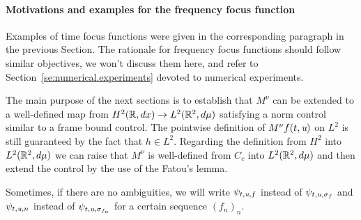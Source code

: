 \paragraph{Motivations and examples for the frequency focus function}
Examples of time focus functions were given in the corresponding paragraph in the previous Section. The rationale for frequency focus functions should follow similar objectives, we won't discuss them here, and refer to Section~\ref{se:numerical.experiments} devoted to numerical experiments.

\bigskip

The main purpose of the next sections is to establish that $M^\nu$ can be extended to a well-defined map from $H^2(\mathbb{R},dx)\rightarrow L^2(\mathbb{R}^2,d\mu)$ satisfying a norm control similar to a frame bound control.  The pointwise definition of $M^\nu f(t,\textit{u})$ on $L^2$ is still guaranteed by the fact that $h\in L^2$. Regarding the definition from $H^2$ into $L^2(\mathbb{R}^2,d\mu)$ we can raise that $M^\nu$ is well-defined from $C_c$ into $L^2(\mathbb{R}^2,d\mu)$ and then extend the control by the use of the Fatou's lemma.

Sometimes, if there are no ambiguities, we will write $\psi_{t,\textit{u},f}$ instead of $\psi_{t,\textit{u},\sigma_f}$ and $\psi_{t,\textit{u},n}$ instead of $\psi_{t,\textit{u},\sigma_{f_n}}$ for a certain sequence $(f_n)_n$.


